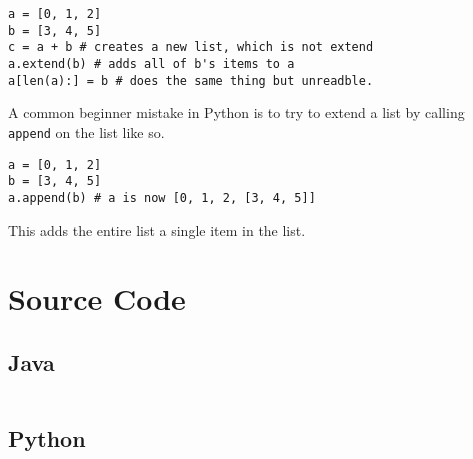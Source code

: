 \begin{verbatim}
a = [0, 1, 2]
b = [3, 4, 5]
c = a + b # creates a new list, which is not extend
a.extend(b) # adds all of b's items to a
a[len(a):] = b # does the same thing but unreadble.
\end{verbatim}
A common beginner mistake in Python is to try to extend a list by calling \texttt{append} on the list like so.

\begin{verbatim}
a = [0, 1, 2]
b = [3, 4, 5]
a.append(b) # a is now [0, 1, 2, [3, 4, 5]]
\end{verbatim}



This adds the entire list a single item in the list.  

\newpage
\section{Source Code}
\subsection{Java}
\inputminted{Java}{code/MyArrayList.java}
\newpage
\subsection{Python}
\inputminted{Python3}{code/arraylist.py}